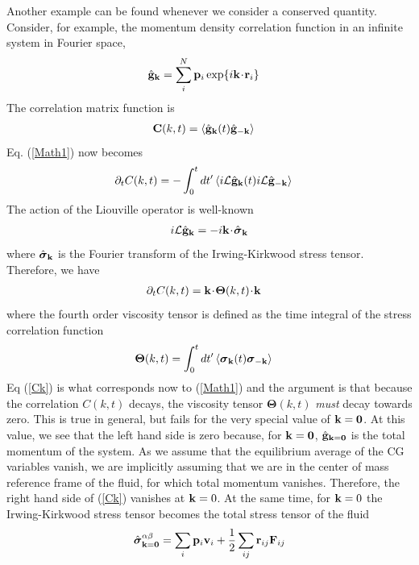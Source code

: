 \documentclass[a4paper,openright,12pt]{book}
\newcommand{\esc}{\!\cdot\!}
\newcommand{\llangle}{\left\langle}
\newcommand{\rrangle}{\right\rangle}
\begin{document}
Another example  can be  found whenever  we consider  a
conserved  quantity.  Consider,  for  example,  the  momentum  density
correlation function in an infinite system in Fourier space,
\begin{align}
\hat{\bf g}_{\bf k}&=\sum_i^N{\bf p}_i\exp\{i{\bf k}\esc{\bf r}_i\}
\end{align}
The correlation matrix function is
\begin{align}
  {\bf C}(k,t)&=\llangle \hat{\bf g}_{\bf k}(t)\hat{\bf g}_{-{\bf k}}\rrangle
\end{align}
Eq. (\ref{Math1}) now becomes
\begin{align}
\partial_t  C(k,t)&=-\int_0^tdt'\llangle i{\cal L} \hat{\bf g}_{\bf k}(t) i{\cal L}\hat{\bf g}_{-{\bf k}}\rrangle
\end{align}
The action of the Liouville operator is well-known
\begin{align}
  i{\cal L}\hat{\bf g}_{\bf k}=-i{\bf k}\esc\hat{\boldsymbol{\sigma}}_{\bf k}
\end{align}
where $\hat{\boldsymbol{\sigma}}_{\bf k}$ is the Fourier transform of the Irwing-Kirkwood
stress tensor.  Therefore, we have
\begin{align}
\partial_t  C(k,t)&={\bf k}\esc\boldsymbol{\Theta}(k,t)\esc {\bf k}
\label{Ck}
\end{align}
where the fourth order viscosity tensor is defined as the time integral of the
stress correlation function
\begin{align}
\boldsymbol{\Theta}(k,t)&=  \int_0^tdt'\llangle \boldsymbol{\sigma}_{\bf k}(t) \boldsymbol{\sigma}_{-{\bf k}}\rrangle
\label{Theta}
\end{align}
Eq  (\ref{Ck})  is  what  corresponds now  to  (\ref{Math1})  and  the
argument  is  that  because   the  correlation  $C(k,t)$  decays,  the
viscosity   tensor   $\boldsymbol{\Theta}(k,t)$  \textit{must}   decay
towards zero.   This is  true in  general, but  fails for  the very special
value of ${\bf k}={\bf 0}$.  At this  value, we see that the left hand
side is zero because, for ${\bf k}={\bf 0}$, $\hat{\bf g}_{{\bf k}=\bf 0}$ is
the total momentum  of the system.  As we assume  that the equilibrium
average of the CG variables vanish, we are implicitly assuming that we
are in  the center  of mass  reference frame of  the fluid,  for which
total momentum vanishes.  Therefore, the right hand  side of (\ref{Ck})
vanishes at  ${\bf k}=0$.  At the same time, for  ${\bf k}=0$  the Irwing-Kirkwood
stress tensor becomes the total stress tensor of the fluid
\begin{align}
  \hat{\boldsymbol{\sigma}}^{\alpha\beta}_{{\bf k}={\bf 0}}=\sum_i{\bf p}_i{\bf v}_i+\frac{1}{2}\sum_{ij}{\bf r}_{ij}{\bf F}_{ ij}
\end{align}
\end{document}

